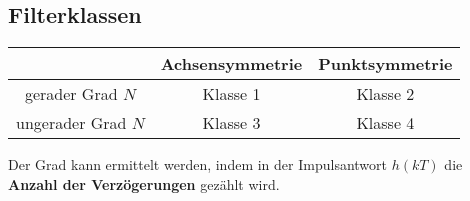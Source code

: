 \documentclass[twoside,10pt,a5paper]{scrartcl}
\begin{document}
\subsection{Filterklassen}

\begin{center}
  \begin{tabular}{ccc}
    \toprule
    & Achsensymmetrie & Punktsymmetrie\\
    \midrule
    gerader Grad \(N\) & Klasse 1 & Klasse 2\\
    ungerader Grad \(N\) & Klasse 3 & Klasse 4\\
    \bottomrule
  \end{tabular}
\end{center}

Der Grad kann ermittelt werden, indem in der Impulsantwort \(h(kT)\) die \textbf{Anzahl der Verzögerungen} gezählt wird.
\end{document}
